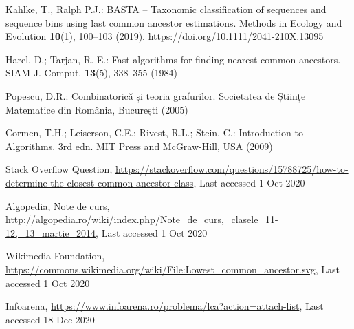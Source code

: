 \documentclass[runningheads]{llncs}
\begin{document}
\newpage
\renewcommand{\refname}{Referințe}
\begin{thebibliography}{8}


Kahlke, T., Ralph P.J.:  BASTA – Taxonomic classification of sequences and sequence bins using last common ancestor estimations. Methods in Ecology and Evolution \textbf{10}(1), 100--103 (2019).
\url{https://doi.org/10.1111/2041-210X.13095}

Harel, D.; Tarjan, R. E.: Fast algorithms for finding nearest common ancestors. SIAM J. Comput. \textbf{13}(5), 338--355 (1984)

Popescu, D.R.: Combinatorică și teoria grafurilor. Societatea de Științe Matematice din România, București (2005)

Cormen, T.H.; Leiserson, C.E.; Rivest, R.L.; Stein, C.: Introduction to Algorithms. 3rd edn. MIT Press and McGraw-Hill,
USA (2009)

Stack Overflow Question, 
\url{https://stackoverflow.com/questions/15788725/how-to-determine-the-closest-common-ancestor-class}, 
Last accessed 1 Oct 2020

Algopedia, Note de curs,
\url{http://algopedia.ro/wiki/index.php/Note_de_curs,_clasele_11-12,_13_martie_2014},
Last accessed 1 Oct 2020

Wikimedia Foundation,
\url{https://commons.wikimedia.org/wiki/File:Lowest_common_ancestor.svg}, 
Last accessed 1 Oct 2020

Infoarena,
\url{https://www.infoarena.ro/problema/lca?action=attach-list},
Last accessed 18 Dec 2020


\end{thebibliography}
\end{document}
